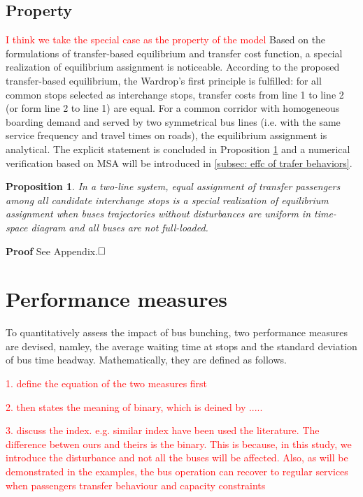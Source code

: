 \documentclass[smallextended]{svjour3}       %
\newtheorem{mypro}[proposition]{Proposition}
\begin{document}
\begin{Abstract}
\subsection{Property}
\textcolor{red}{I think we take the special case as the property of the model}
Based on the formulations of transfer-based equilibrium and transfer cost function, a special realization of equilibrium assignment is noticeable.
According to the proposed transfer-based equilibrium, the Wardrop's first principle is fulfilled: 
for all common stops selected as interchange stops, transfer costs from line 1 to line 2 (or form line 2 to line 1) are equal.
For a common corridor with homogeneous boarding demand and served by two symmetrical bus lines (i.e. with the same service frequency and travel times on roads), the equilibrium assignment is analytical.
The explicit statement is concluded in Proposition \ref{pro:equal assignment} and a numerical verification based on MSA will be introduced in \ref{subsec: effc of trafer behaviors}. 
\begin{mypro}\label{pro:equal assignment}
    In a two-line system, equal assignment of transfer passengers among all candidate interchange stops is a special realization of equilibrium assignment when buses trajectories without disturbances are uniform in time-space diagram and all buses are not full-loaded. 
\end{mypro}
\noindent \textbf{Proof} See Appendix.$\hfill\square$ 

\section{Performance measures} \label{PM}
To quantitatively assess the impact of bus bunching, two performance measures are devised, namley, the average waiting time at stops and the standard deviation of bus time headway. Mathematically, they are defined as follows. 

\textcolor{red}{
    1. define the equation of the two measures first 

    2. then states the meaning of binary, which is deined by .....
    
    3. discuss the index. e.g. similar index have been used the literature. The difference betwen ours and theirs is the binary. This is because, in this study, we introduce the disturbance and not all the buses will be affected. Also, as will be demonstrated in the examples,  the bus operation can recover to regular services when passengers transfer behaviour and capacity constraints
    }


\end{Abstract}
\end{document}
